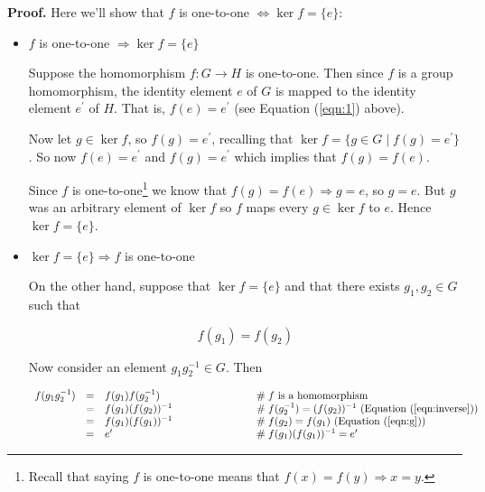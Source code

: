 \documentclass{article}
\theoremstyle{definition}
\begin{document}
\noindent
\textbf{Proof.}  Here we'll show that $f$ is one-to-one  $\iff
\ker f =\{e\}$:  
\begin{itemize}
\item $f$ is one-to-one  $\Rightarrow \ker f =\{e\}$ 

Suppose the homomorphism $f : G \rightarrow H$ is
one-to-one. Then since $f$ is a group homomorphism, the identity
element $e$ of $G$ is mapped to the identity element $e^\prime$
of $H$. That is, $f(e ) = e^\prime$ (see Equation (\ref{eqn:1})
above).

Now let $g \in \ker f$, so $f(g) = e^\prime$, recalling that
$\ker f = \{g \in G \mid f(g) = e^\prime\}$. So now $f(e) =
e^\prime$ and $f(g) = e^\prime$ which implies that $f(g)=f(e)$.
 
Since $f$ is one-to-one\footnote{Recall that saying $f$ is
one-to-one means that $f(x) = f(y) \Rightarrow x = y$.} we know
that $f(g) = f(e) \Rightarrow g = e$, so $g = e$. But $g$ was an
arbitrary element of $\ker f$ so $f$ maps every $g \in \ker f$ to
$e$. Hence $\ker f = \{e\}$.

\item $\ker f = \{e\} \Rightarrow f$ is one-to-one

On the other hand, suppose that $\ker f = \{e\}$ and that there
exists $g_1, g_2 \in G$ such that

\begin{equation}
f(g_1) = f(g_2) 
\label{eqn:g}
\end{equation}

Now consider an element $g_1g_2^{-1} \in G$. Then

\begin{equation}
\begin{array}{rcll}
f(g_1g_2^{-1})
&=& f(g_1) f(g_2^{-1})          &\hspace{7em} \mathrel{\#} \text{$f$ is a homomorphism} \\
&=& f(g_1) (f(g_2))^{-1}        &\hspace{7em} \mathrel{\#} f(g_2^{-1})   = (f(g_2))^{-1}
														\text{ (Equation (\ref{eqn:inverse}))} \\
&=& f(g_1) (f(g_1))^{-1}        &\hspace{7em} \mathrel{\#} f(g_2) = f(g_1)  \text{ (Equation (\ref{eqn:g}))} \\
&=& e^\prime                    &\hspace{7em} \mathrel{\#} f(g_1) (f(g_1))^{-1}  = e^\prime
\end{array}
\label{eqn:eprime}
\end{equation}


\end{itemize}
\end{document}
